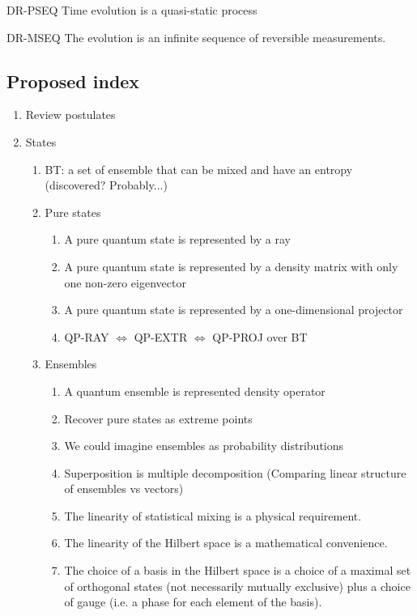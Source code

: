 \begin{condition}{DR-PSEQ}
	Time evolution is a quasi-static process
\end{condition}

\begin{condition}{DR-MSEQ}
	The evolution is an infinite sequence of reversible measurements.
\end{condition}

\subsection{Proposed index}
\begin{enumerate}
	\item Review postulates
	\item States
	\begin{enumerate}
		\item BT: a set of ensemble that can be mixed and have an entropy (discovered? Probably...)
		\item Pure states
		\begin{enumerate}
			\item[QP-RAY] A pure quantum state is represented by a ray
			\item[QP-EXTR] A pure quantum state is represented by a density matrix with only one non-zero eigenvector
			\item[QP-PROJ] A pure quantum state is represented by a one-dimensional projector
			\item QP-RAY $\iff$ QP-EXTR $\iff$ QP-PROJ over BT
		\end{enumerate}
		\item Ensembles
		\begin{enumerate}
			\item[QE-DENS] A quantum ensemble is represented density operator
			\item[QE $\implies$ QP] Recover pure states as extreme points
			\item[QP $\nimplies$ QE] We could imagine ensembles as probability distributions
			\item[?] Superposition is multiple decomposition (Comparing linear structure of ensembles vs vectors)
			\item[?] The linearity of statistical mixing is a physical requirement. 
			\item[?] The linearity of the Hilbert space is a mathematical convenience.
			\item[?] The choice of a basis in the Hilbert space is a choice of a maximal set of orthogonal states (not necessarily mutually exclusive) plus a choice of gauge (i.e. a phase for each element of the basis).

\end{enumerate}
\end{enumerate}
\end{enumerate}
